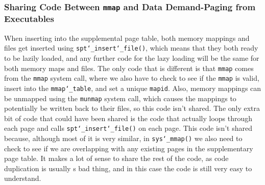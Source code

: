 \documentclass{article}
\renewcommand{\_}{\char`_}
\begin{document}
\subsubsection{Sharing Code Between \texttt{mmap} and Data Demand-Paging from Executables}

When inserting into the supplemental page table, both memory mappings and files get inserted using \texttt{spt\_insert\_file()}, which means that they both ready to be lazily loaded, and any further code for the lazy loading will be the same for both memory maps and files. The only code that is different is that \texttt{mmap} comes from the \texttt{mmap} system call, where we also have to check to see if the \texttt{mmap} is valid, insert into the \texttt{mmap\_table}, and set a unique \texttt{mapid}. Also, memory mappings can be unmapped using the \texttt{munmap} system call, which causes the mappings to potentially be written back to their files, so this code isn't shared. The only extra bit of code that could have been shared is the code that actually loops through each page and calls \texttt{spt\_insert\_file()} on each page. This code isn't shared because, although most of it is very similar, in \texttt{sys\_mmap()} we also need to check to see if we are overlapping with any existing pages in the supplementary page table. It makes a lot of sense to share the rest of the code, as code duplication is usually s bad thing, and in this case the code is still very easy to understand.
\end{document}
